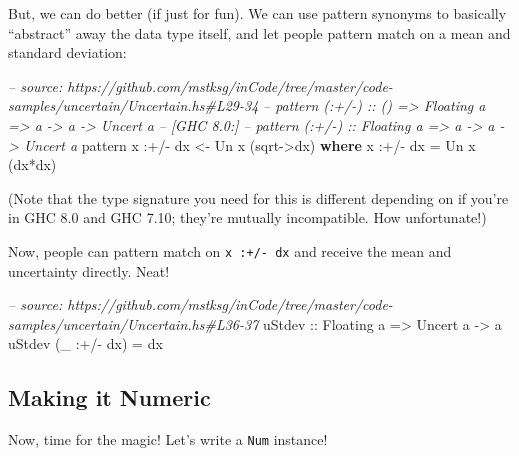 \documentclass[]{article}
\newenvironment{Shaded}{}{}
\newcommand{\KeywordTok}[1]{\textcolor[rgb]{0.00,0.44,0.13}{\textbf{#1}}}
\newcommand{\DataTypeTok}[1]{\textcolor[rgb]{0.56,0.13,0.00}{#1}}
\newcommand{\CommentTok}[1]{\textcolor[rgb]{0.38,0.63,0.69}{\textit{#1}}}
\newcommand{\OtherTok}[1]{\textcolor[rgb]{0.00,0.44,0.13}{#1}}
\newcommand{\FunctionTok}[1]{\textcolor[rgb]{0.02,0.16,0.49}{#1}}
\newcommand{\NormalTok}[1]{#1}
\begin{document}
But, we can do better (if just for fun). We can use pattern synonyms to
basically ``abstract'' away the data type itself, and let people pattern match
on a mean and standard deviation:

\begin{Shaded}
\begin{Highlighting}[]
\CommentTok{-- source: https://github.com/mstksg/inCode/tree/master/code-samples/uncertain/Uncertain.hs#L29-34}
\CommentTok{-- pattern (:+/-) :: () => Floating a => a -> a -> Uncert a}
\CommentTok{-- [GHC 8.0:]}
\CommentTok{-- pattern (:+/-) :: Floating a => a -> a -> Uncert a}
\NormalTok{pattern x }\FunctionTok{:+/-}\NormalTok{ dx }\OtherTok{<-} \DataTypeTok{Un}\NormalTok{ x (sqrt}\OtherTok{->}\NormalTok{dx)}
  \KeywordTok{where}
\NormalTok{    x }\FunctionTok{:+/-}\NormalTok{ dx }\FunctionTok{=} \DataTypeTok{Un}\NormalTok{ x (dx}\FunctionTok{*}\NormalTok{dx)}
\end{Highlighting}
\end{Shaded}

(Note that the type signature you need for this is different depending on if
you're in GHC 8.0 and GHC 7.10; they're mutually incompatible. How unfortunate!)

Now, people can pattern match on \texttt{x\ :+/-\ dx} and receive the mean and
uncertainty directly. Neat!

\begin{Shaded}
\begin{Highlighting}[]
\CommentTok{-- source: https://github.com/mstksg/inCode/tree/master/code-samples/uncertain/Uncertain.hs#L36-37}
\OtherTok{uStdev ::} \DataTypeTok{Floating}\NormalTok{ a }\OtherTok{=>} \DataTypeTok{Uncert}\NormalTok{ a }\OtherTok{->}\NormalTok{ a}
\NormalTok{uStdev (_ }\FunctionTok{:+/-}\NormalTok{ dx) }\FunctionTok{=}\NormalTok{ dx}
\end{Highlighting}
\end{Shaded}

\subsection{Making it Numeric}\label{making-it-numeric}

Now, time for the magic! Let's write a \texttt{Num} instance!
\end{document}
